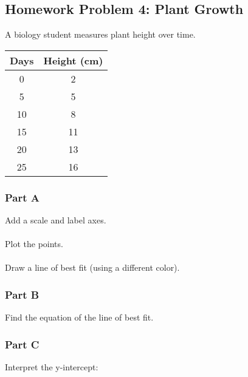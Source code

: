 \documentclass[12pt]{article}
\begin{document}
				\vspace{3cm}

				\newpage

		\subsection*{Homework Problem 4: Plant Growth}

			A biology student measures plant height over time.

			\begin{center}
				\begin{tabular}{|c|c|}
					\hline
					Days & Height (cm) \\
					\hline
					0 & 2 \\
					5 & 5 \\
					10 & 8 \\
					15 & 11 \\
					20 & 13 \\
					25 & 16 \\
					\hline
				\end{tabular}
			\end{center}

			\subsubsection*{Part A}
			
				Add a scale and label axes.\\\\
				Plot the points.\\\\
				Draw a line of best fit (using a different color).

				\vspace{8cm}

			\subsubsection*{Part B}
			
				Find the equation of the line of best fit.

				\newpage

			\subsubsection*{Part C}
			
				Interpret the y-intercept:

				\vspace{2cm}
\end{document}
